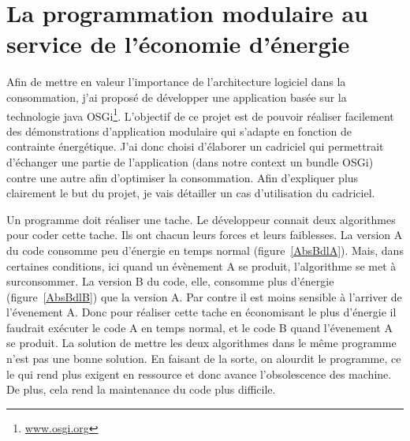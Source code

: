 \documentclass[a4paper, 11pt]{report}
\begin{document}
\chapter{La programmation modulaire au service de l'économie d'énergie}
Afin de mettre en valeur l'importance de l'architecture logiciel dans la consommation, j'ai proposé de développer une application basée sur la technologie java OSGi\footnote{\href{http://www.osgi.org}{www.osgi.org}}. L'objectif de ce projet est de pouvoir réaliser facilement des démonstrations d'application modulaire qui s'adapte en fonction de contrainte énergétique. J'ai donc choisi d'élaborer un cadriciel qui permettrait d'échanger une partie de l'application (dans notre context un \og bundle \fg OSGi) contre une autre afin d'optimiser la consommation. Afin d'expliquer plus clairement le but du projet, je vais détailler un cas d'utilisation du cadriciel.

Un programme doit réaliser une tache. Le développeur connait deux algorithmes pour coder cette tache. Ils ont chacun leurs forces et leurs faiblesses. La version A du code consomme peu d'énergie en temps normal (figure~\ref{AbsBdlA}). Mais, dans certaines conditions, ici quand un évènement A se produit, l'algorithme se met à surconsommer. La version B du code, elle, consomme plus d'énergie (figure~\ref{AbsBdlB}) que la version A. Par contre il est moins sensible à l'arriver de l'évenement A. Donc pour réaliser cette tache en économisant le plus d'énergie il faudrait exécuter le code A en temps normal, et le code B quand l'évenement A se produit. La solution de mettre les deux algorithmes dans le même programme n'est pas une bonne solution. En faisant de la sorte, on alourdit le programme, ce le qui rend plus exigent en ressource et donc avance l'obsolescence des machine. De plus, cela rend la maintenance du code plus difficile.
\end{document}
